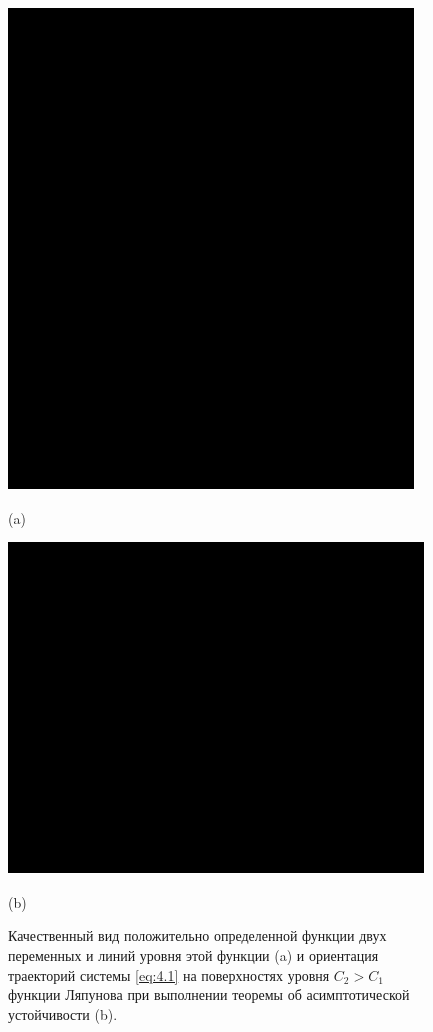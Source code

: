 \begin{figure}[h!]
        \centering
        \begin{minipage}{0.45\linewidth}
                \centering  
                \includegraphics[]{fig/lect4/1a}

                (a)
        \end{minipage}
        \begin{minipage}{0.45\linewidth}
                \centering  
                \includegraphics[]{fig/lect4/1b}

                (b)      
        \end{minipage}
        \caption{Качественный вид положительно определенной функции двух переменных и линий уровня этой функции (a) и ориентация траекторий системы \eqref{eq:4.1} на поверхностях уровня $C_2 >C_1$ функции Ляпунова при выполнении теоремы об асимптотической устойчивости (b).}
        \label{fig:4.1}
\end{figure}

